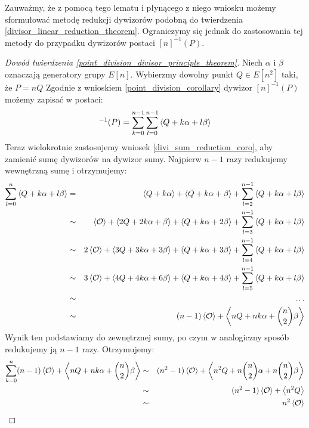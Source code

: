 Zauważmy, że z pomocą tego lematu i płynącego z niego wniosku
możemy sformułować metodę redukcji dywizorów
podobną do twierdzenia \ref{divisor_linear_reduction_theorem}.
Ograniczymy się jednak do zastosowania tej metody
do przypadku dywizorów postaci $[n]^{-1}(P)$.

\begin{proof}[Dowód twierdzenia \ref{point_division_divisor_principle_theorem}]
Niech $\alpha$ i $\beta$ oznaczają generatory grupy $E[n]$.
Wybierzmy dowolny punkt $Q \in E[n^2]$ taki, że $P = nQ$
Zgodnie z wnioskiem \ref{point_division_corollary}
dywizor $[n]^{-1}(P)$ możemy zapisać w postaci:
\begin{equation*}
[n]^{-1}(P) = \sum_{k=0}^{n-1} \sum_{l=0}^{n-1} \divi{Q + k\alpha + l\beta}
\end{equation*}
Teraz wielokrotnie zastosujemy wniosek \ref{divi_sum_reduction_coro},
aby zamienić sumę dywizorów na dywizor sumy.
Najpierw $n-1$ razy redukujemy wewnętrzną sumę i otrzymujemy:
\begin{eqnarray*}
\sum_{l=0}^n \left\langle Q + k\alpha + l\beta\right\rangle
& =    & \left\langle Q + k\alpha\right\rangle + \left\langle Q + k\alpha + \beta\right\rangle +
         \sum_{l=2}^{n-1} \left\langle Q + k\alpha + l\beta\right\rangle \\
& \sim & \left\langle\mathcal{O}\right\rangle + \left\langle2Q + 2k\alpha + \beta\right\rangle +
         \left\langle Q + k\alpha + 2\beta\right\rangle +
         \sum_{l=3}^{n-1} \left\langle Q + k\alpha + l\beta\right\rangle \\
& \sim & 2\left\langle\mathcal{O}\right\rangle + \left\langle3Q + 3k\alpha + 3\beta\right\rangle +
         \left\langle Q + k\alpha + 3\beta\right\rangle +
         \sum_{l=4}^{n-1} \left\langle Q + k\alpha + l\beta\right\rangle \\
& \sim & 3\left\langle\mathcal{O}\right\rangle + \left\langle4Q + 4k\alpha + 6\beta\right\rangle +
         \left\langle Q + k\alpha + 4\beta\right\rangle +
         \sum_{l=5}^{n-1} \left\langle Q + k\alpha + l\beta\right\rangle \\
& \sim & \ldots \\
& \sim & (n-1)\left\langle\mathcal{O}\right\rangle + \left\langle nQ + nk\alpha + \binom{n}{2}\beta\right\rangle
\end{eqnarray*}
Wynik ten podstawiamy do zewnętrznej sumy,
po czym w analogiczny sposób redukujemy ją $n-1$ razy.
Otrzymujemy:
\begin{eqnarray*}
\sum_{k=0}^n (n-1)\left\langle\mathcal{O}\right\rangle +
             \left\langle nQ + nk\alpha + \binom{n}{2}\beta\right\rangle
& \sim & (n^2-1)\left\langle\mathcal{O}\right\rangle +
         \left\langle n^2Q + n\binom{n}{2}\alpha + n\binom{n}{2}\beta\right\rangle \\
& \sim & (n^2-1)\left\langle\mathcal{O}\right\rangle + \left\langle n^2Q\right\rangle \\
& \sim & n^2\left\langle\mathcal{O}\right\rangle
\end{eqnarray*}
\end{proof}

